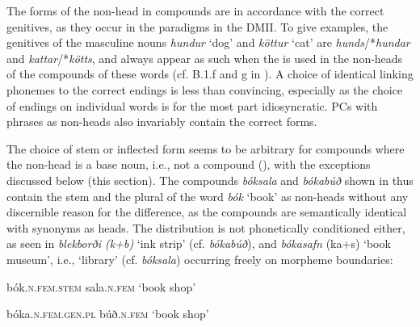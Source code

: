 \documentclass[output=paper]{LSP/langsci}
\begin{document}
The  forms of the non-head in compounds are in accordance with the correct genitives, as they occur in the paradigms in the DMII. To give examples, the genitives of the masculine nouns \textit{hundur} ‘dog’ and \textit{köttur} ‘cat’ are \textit{hunds}/*\textit{hundar} and \textit{kattar}/*\textit{kötts}, and always appear as such when the  is used in the non-heads of the compounds of these words (cf. B.1.f and g in ). A choice of identical linking phonemes to the correct  endings is less than convincing, especially as the choice of endings on individual words is for the most part idiosyncratic. PCs with  phrases as non-heads also invariably contain the correct  forms. 


The choice of stem or inflected form seems to be arbitrary for compounds where the non-head is a base noun, i.e., not a compound (\citealt{Bjarnadóttir1995}), with the exceptions discussed below (this section). The compounds \textit{bóksala} and \textit{bóka\-búð} shown in  thus contain the stem and the  plural of the word \textit{bók} ‘book’ as non-heads without any discernible reason for the difference, as the compounds are semantically identical with synonyms as heads. The distribution is not phonetically conditioned either, as seen in \textit{blekborði (k+b)} ‘ink strip’ (cf. \textit{bókabúð}), and \textit{bókasafn} (ka+s) ‘book museum’, i.e., ‘library’ (cf. \textit{bóksala}) occurring freely on morpheme boundaries:


\ea%
 \label{ex:bjarnadottir:6} 
\ea bók\textsc{.n.fem.stem} sala\textsc{.n.fem} ‘book shop’

\ex  bóka\textsc{.n.fem.gen.pl} búð\textsc{.n.fem} ‘book shop’
\z
\z
\end{document}
